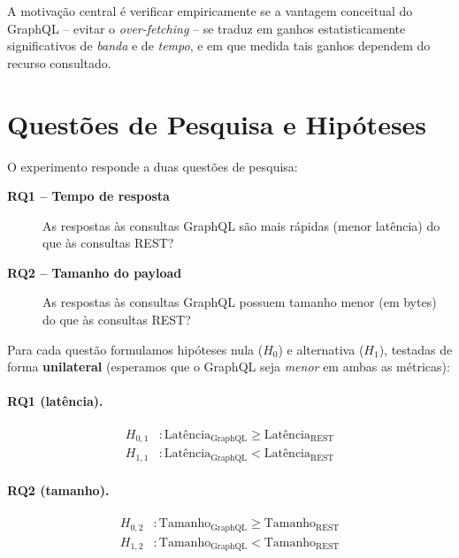 \documentclass[10pt,a4paper,twocolumn]{article}
\begin{document}
A motivação central é verificar empiricamente se a vantagem conceitual do
GraphQL -- evitar o \textit{over-fetching} -- se traduz em ganhos
estatisticamente significativos de \emph{banda} e de \emph{tempo}, e em que
medida tais ganhos dependem do recurso consultado.

\section{Questões de Pesquisa e Hipóteses}

O experimento responde a duas questões de pesquisa:

\begin{description}
  \item[\textbf{RQ1 -- Tempo de resposta}] As respostas às consultas GraphQL
    são mais rápidas (menor latência) do que às consultas REST?
  \item[\textbf{RQ2 -- Tamanho do payload}] As respostas às consultas GraphQL
    possuem tamanho menor (em bytes) do que às consultas REST?
\end{description}

Para cada questão formulamos hipóteses nula ($H_0$) e alternativa ($H_1$),
testadas de forma \textbf{unilateral} (esperamos que o GraphQL seja
\emph{menor} em ambas as métricas):

\paragraph{RQ1 (latência).}
\begin{align*}
  H_{0,1}&: \text{Latência}_{\text{GraphQL}} \geq \text{Latência}_{\text{REST}}\\
  H_{1,1}&: \text{Latência}_{\text{GraphQL}} < \text{Latência}_{\text{REST}}
\end{align*}

\paragraph{RQ2 (tamanho).}
\begin{align*}
  H_{0,2}&: \text{Tamanho}_{\text{GraphQL}} \geq \text{Tamanho}_{\text{REST}}\\
  H_{1,2}&: \text{Tamanho}_{\text{GraphQL}} < \text{Tamanho}_{\text{REST}}
\end{align*}
\end{document}

